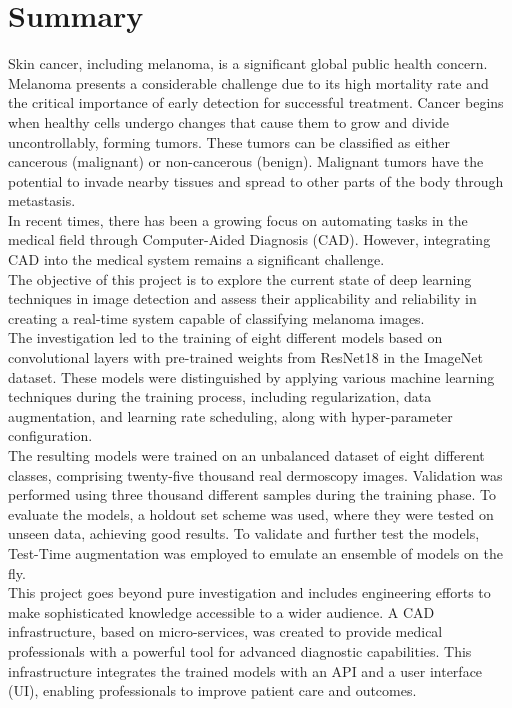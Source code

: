 \chapter*{Summary}

Skin cancer, including melanoma, is a significant global public health concern.
Melanoma presents a considerable challenge due to its high mortality rate and
the critical importance of early detection for successful treatment. Cancer
begins when healthy cells undergo changes that cause them to grow and divide
uncontrollably, forming tumors. These tumors can be classified as either
cancerous (malignant) or non-cancerous (benign). Malignant tumors have the
potential to invade nearby tissues and spread to other parts of the body
through metastasis. \\

In recent times, there has been a growing focus on automating tasks in the
medical field through Computer-Aided Diagnosis (CAD). However, integrating CAD
into the medical system remains a significant challenge. \\

The objective of this project is to explore the current state of deep learning
techniques in image detection and assess their applicability and reliability in
creating a real-time system capable of classifying melanoma images. \\

The investigation led to the training of eight different models based on
convolutional layers with pre-trained weights from ResNet18 in the ImageNet
dataset. These models were distinguished by applying various machine learning
techniques during the training process, including regularization, data
augmentation, and learning rate scheduling, along with hyper-parameter
configuration. \\

The resulting models were trained on an unbalanced dataset of eight different
classes, comprising twenty-five thousand real dermoscopy images. Validation was
performed using three thousand different samples during the training phase. To
evaluate the models, a holdout set scheme was used, where they were tested on
unseen data, achieving good results. To validate and further test the models,
Test-Time augmentation was employed to emulate an ensemble of models on the
fly. \\

This project goes beyond pure investigation and includes engineering efforts to
make sophisticated knowledge accessible to a wider audience. A CAD
infrastructure, based on micro-services, was created to provide medical
professionals with a powerful tool for advanced diagnostic capabilities. This
infrastructure integrates the trained models with an API and a user interface
(UI), enabling professionals to improve patient care and outcomes. \\

